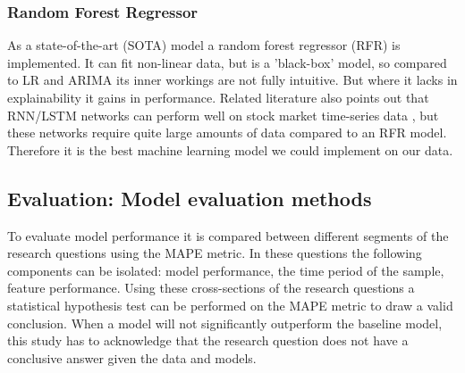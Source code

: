 \subsubsection{Random Forest Regressor}
\label{sec:rfr}
As a state-of-the-art (SOTA) model a random forest regressor (RFR) is implemented. It can fit non-linear data, but is a 'black-box' model, so compared to LR and ARIMA its inner workings are not fully intuitive. But where it lacks in explainability it gains in performance. Related literature also points out that RNN/LSTM networks can perform well on stock market time-series data \cite{YU20082623}, but these networks require quite large amounts of data compared to an RFR model. Therefore it is the best machine learning model we could implement on our data.

\subsection{Evaluation: Model evaluation methods}
\label{sec:eval}
To evaluate model performance it is compared between different segments of the research questions using the MAPE metric. In these questions the following components can be isolated: model performance, the time period of the sample, feature performance.
Using these cross-sections of the research questions a statistical hypothesis test can be performed on the MAPE metric to draw a valid conclusion. When a model will not significantly outperform the baseline model, this study has to acknowledge that the research question does not have a conclusive answer given the data and models.